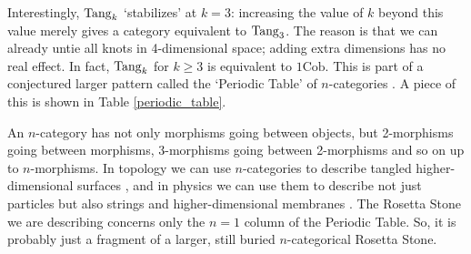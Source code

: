 \documentclass[12pt]{article}
\newcommand{\Cob}{\mathrm{Cob}}
\newcommand{\Tang}{{\rm Tang}}
\begin{document}
Interestingly, $\Tang_k$ `stabilizes' at $k = 3$: increasing the value
of $k$ beyond this value merely gives a category equivalent to
$\Tang_3$.  The reason is that we can already untie all knots in
4-dimensional space; adding extra dimensions has no real effect.  
In fact, $\Tang_k$ for $k \ge 3$ is equivalent to $1\Cob$.
This is part of a conjectured larger pattern called the `Periodic 
Table' of $n$-categories \cite{BD}.  A piece of this is shown in 
Table \ref{periodic_table}.

An $n$-category has not only morphisms going between objects, but 
2-morphisms going between morphisms, 3-morphisms going between 
2-morphisms and so on up to $n$-morphisms.  In topology we can 
use $n$-categories to describe tangled higher-dimensional surfaces
\cite{HDA4}, and in physics we can use them to describe not just 
particles but also strings and higher-dimensional membranes \cite{BD,BL}.   
The Rosetta Stone we are describing concerns only the $n = 1$ column 
of the Periodic Table.   So, it is probably just a fragment 
of a larger, still buried $n$-categorical Rosetta Stone.  
\end{document}
